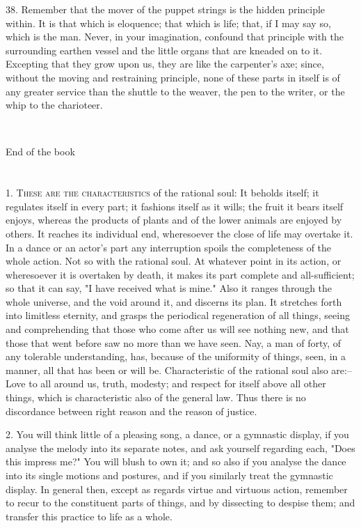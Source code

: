 \documentclass{book}
\newcommand\terminus[1]{\vspace{2em}\emph{#1} \\[2em] \begin{center}End of the \ordinalstring{chapter} book\end{center}}
\begin{document}
38. Remember that the mover of the puppet strings is the hidden
principle within. It is that which is eloquence; that which is life;
that, if I may say so, which is the man. Never, in your imagination,
confound that principle with the surrounding earthen vessel and the
little organs that are kneaded on to it. 
\newpage
Excepting that they grow upon
us, they are like the carpenter's axe; since, without the moving and
restraining principle, none of these parts in itself is of any greater
service than the shuttle to the weaver, the pen to the writer, or the
whip to the charioteer.

\terminus{}
\chapter[These are the characteristics...]{}

1. \textsc{These are the characteristics} of the rational soul: It beholds
itself; it regulates itself in every part; it fashions itself as it
wills; the fruit it bears itself enjoys, whereas the products of
plants and of the lower animals are enjoyed by others. It reaches its
individual end, wheresoever the close of life may overtake it. In a
dance or an actor's part any interruption spoils the completeness of
the whole action. Not so with the rational soul. At whatever point in
its action, or wheresoever it is overtaken by death, it makes its part
complete and all-sufficient; so that it can say, "I have received what
is mine." Also it ranges through the whole universe, and the void
around it, and discerns its plan. It stretches forth into limitless
eternity, and grasps the periodical regeneration of all things, seeing
and comprehending that those who come after us will see nothing new,
and that those that went before saw no more than we have seen. Nay, a
man of forty, of any tolerable understanding, has, because of the
uniformity of things, seen, in a manner, all that has been or will
be. Characteristic of the rational soul also are:--Love to all around
us, truth, modesty; and respect for itself above all other things,
which is characteristic also of the general law. Thus there is no
discordance between right reason and the reason of justice.

2. You will think little of a pleasing song, a dance, or a gymnastic
display, if you analyse the melody into its separate notes, and ask
yourself regarding each, "Does this impress me?" You will blush to own
it; and so also if you analyse the dance into its single motions and
postures, and if you similarly treat the gymnastic display. In general
then, except as regards virtue and virtuous action, remember to recur
to the constituent parts of things, and by dissecting to despise them;
and transfer this practice to life as a whole.
\end{document}
